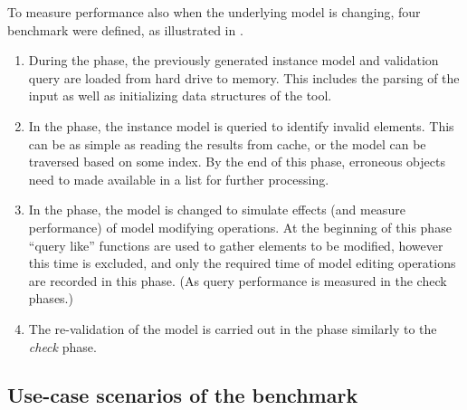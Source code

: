 To measure performance also when the underlying model is changing, four benchmark  were defined, as illustrated in .
\begin{enumerate}
 
 \item During the  phase, the previously generated instance model and validation query are loaded from hard drive to memory. This includes the parsing of the input as well as initializing data structures of the tool.
 
 \item In the  phase, the instance model is queried to identify invalid elements. This can be as simple as reading the results from cache, or the model can be traversed based on some index. By the end of this phase, erroneous objects need to made available in a list for further processing.
 
 \item In the  phase, the model is changed to simulate effects (and measure performance) of model modifying operations. At the beginning of this phase ``query like'' functions are used to gather elements to be modified, however this time is excluded, and only the required time of model editing operations are recorded in this phase. (As query performance is measured in the check phases.)
 
 \item The re-validation of the model is carried out in the  phase similarly to the \emph{check} phase.
\end{enumerate}

\subsection{Use-case scenarios of the benchmark}
\label{sec:scenarios}

